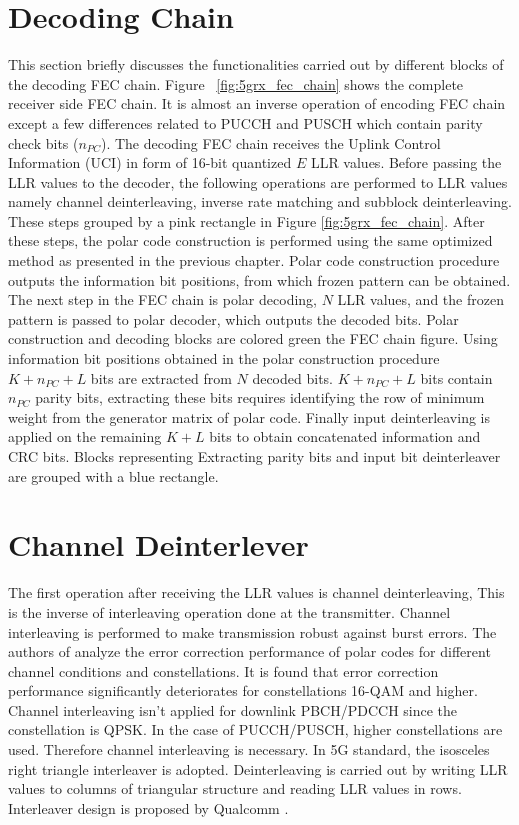 \section{Decoding Chain}
This section briefly discusses the functionalities carried out by different blocks of the decoding FEC chain. Figure ~\ref{fig:5grx_fec_chain} shows the complete receiver side FEC chain. It is almost an inverse operation of encoding FEC chain except a few differences related to PUCCH and PUSCH which contain parity check bits ($ n_{PC} $). The decoding FEC chain receives the Uplink Control Information (UCI) in form of 16-bit quantized $ E $ LLR values. Before passing the LLR values to the decoder, the following operations are performed to LLR values namely channel deinterleaving, inverse rate matching and subblock deinterleaving. These steps grouped by a pink rectangle in Figure \ref{fig:5grx_fec_chain}. After these steps, the polar code construction is performed using the same optimized method as presented in the previous chapter. Polar code construction procedure outputs the information bit positions, from which frozen pattern can be obtained. The next step in the FEC chain is polar decoding, $ N $ LLR values, and the frozen pattern is passed to polar decoder, which outputs the decoded bits. Polar construction and decoding blocks are colored green the FEC chain figure. Using information bit positions obtained in the polar construction procedure $ K + n_{PC} + L $ bits are extracted from $ N $ decoded bits. $ K + n_{PC} + L $ bits contain $ n_{PC} $ parity bits, extracting these bits requires identifying the row of minimum weight from the generator matrix of polar code. Finally input deinterleaving is applied on the remaining $ K +  L $ bits to obtain concatenated information and CRC bits. Blocks representing Extracting parity bits and input bit deinterleaver are grouped with a blue rectangle.

\section{Channel Deinterlever}
The first operation after receiving the LLR values is channel deinterleaving, This is the inverse of interleaving operation done at the transmitter. Channel interleaving is performed to make transmission robust against burst errors. The authors of \cite{3gpp.TSG-RAN_WG1} analyze the error correction performance of polar codes for different channel conditions and constellations. It is found that error correction performance significantly deteriorates for constellations 16-QAM and higher. Channel interleaving isn't applied for downlink PBCH/PDCCH since the constellation is QPSK. In the case of PUCCH/PUSCH, higher constellations are used. Therefore channel interleaving is necessary. In 5G standard, the isosceles right triangle interleaver is adopted. Deinterleaving is carried out by writing LLR values to columns of triangular structure and reading LLR values in rows. Interleaver design is proposed by Qualcomm \cite{3gpp.TSG-RAN_WG1}.

